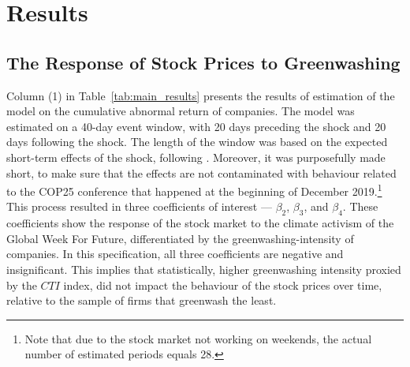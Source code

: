 \documentclass[12pt]{article}
\begin{document}

\section{Results}\label{sect:results}


\subsection{The Response of Stock Prices to Greenwashing}\label{subsect:stocks}

Column (1) in Table~\ref{tab:main_results} presents the results of estimation of the model on the cumulative abnormal return of companies. The model was estimated on a 40-day event window, with 20 days preceding the shock and 20 days following the shock. The length of the window was based on the expected short-term effects of the shock, following \textcite{schusterStockPriceReactions2023}. Moreover, it was purposefully made short, to make sure that the effects are not contaminated with behaviour related to the COP25 conference that happened at the beginning of December 2019.\footnote{Note that due to the stock market not working on weekends, the actual number of estimated periods equals 28.} This process resulted in three coefficients of interest --- $\beta_2$, $\beta_3$, and $\beta_4$. These coefficients show the response of the stock market to the climate activism of the Global Week For Future, differentiated by the greenwashing-intensity of companies. In this specification, all three coefficients are negative and insignificant. This implies that statistically, higher greenwashing intensity proxied by the $CTI$ index, did not impact the behaviour of the stock prices over time, relative to the sample of firms that greenwash the least. 
\end{document}
